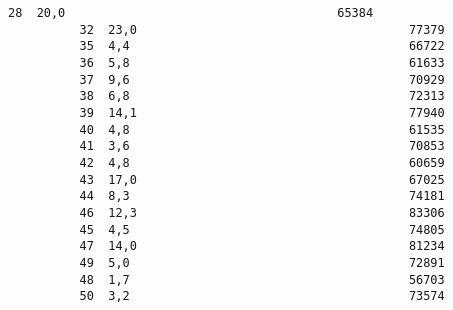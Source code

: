 \documentclass[11pt]{article}
\begin{document}
\begin{Verbatim}[commandchars=\\\{\}]
          28  20,0                                      65384                  
          32  23,0                                      77379                  
          35  4,4                                       66722                  
          36  5,8                                       61633                  
          37  9,6                                       70929                  
          38  6,8                                       72313                  
          39  14,1                                      77940                  
          40  4,8                                       61535                  
          41  3,6                                       70853                  
          42  4,8                                       60659                  
          43  17,0                                      67025                  
          44  8,3                                       74181                  
          46  12,3                                      83306                  
          45  4,5                                       74805                  
          47  14,0                                      81234                  
          49  5,0                                       72891                  
          48  1,7                                       56703                  
          50  3,2                                       73574                  
          

\end{Verbatim}
\end{document}
